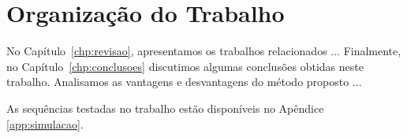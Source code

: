 \section{Organização do Trabalho}
\label{sec:organizacao}

No Capítulo~\ref{chp:revisao}, apresentamos os trabalhos relacionados ... Finalmente, no
Capítulo~\ref{chp:conclusoes} discutimos algumas conclusões obtidas neste
trabalho. Analisamos as vantagens e desvantagens do método proposto ... 

As sequências testadas no trabalho estão disponíveis no Apêndice \ref{app:simulacao}.

